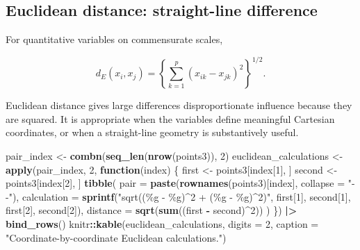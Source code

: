 \documentclass[
  english,
]{article}
\newenvironment{Shaded}{\begin{snugshade}}{\end{snugshade}}
\newcommand{\AttributeTok}[1]{\textcolor[rgb]{0.13,0.29,0.53}{#1}}
\newcommand{\ControlFlowTok}[1]{\textcolor[rgb]{0.13,0.29,0.53}{\textbf{#1}}}
\newcommand{\DecValTok}[1]{\textcolor[rgb]{0.00,0.00,0.81}{#1}}
\newcommand{\FunctionTok}[1]{\textcolor[rgb]{0.13,0.29,0.53}{\textbf{#1}}}
\newcommand{\NormalTok}[1]{#1}
\newcommand{\OtherTok}[1]{\textcolor[rgb]{0.56,0.35,0.01}{#1}}
\newcommand{\SpecialCharTok}[1]{\textcolor[rgb]{0.81,0.36,0.00}{\textbf{#1}}}
\newcommand{\StringTok}[1]{\textcolor[rgb]{0.31,0.60,0.02}{#1}}
\begin{document}
\subsection{Euclidean distance: straight-line
difference}\label{euclidean-distance-straight-line-difference}

For quantitative variables on commensurate scales,

\[d_E(x_i,x_j)=\left\{\sum_{k=1}^p(x_{ik}-x_{jk})^2\right\}^{1/2}.\]

Euclidean distance gives large differences disproportionate influence
because they are squared. It is appropriate when the variables define
meaningful Cartesian coordinates, or when a straight-line geometry is
substantively useful.

\begin{Shaded}
\begin{Highlighting}[]
\NormalTok{pair\_index }\OtherTok{\textless{}{-}} \FunctionTok{combn}\NormalTok{(}\FunctionTok{seq\_len}\NormalTok{(}\FunctionTok{nrow}\NormalTok{(points3)), }\DecValTok{2}\NormalTok{)}
\NormalTok{euclidean\_calculations }\OtherTok{\textless{}{-}} \FunctionTok{apply}\NormalTok{(pair\_index, }\DecValTok{2}\NormalTok{, }\ControlFlowTok{function}\NormalTok{(index) \{}
\NormalTok{  first }\OtherTok{\textless{}{-}}\NormalTok{ points3[index[}\DecValTok{1}\NormalTok{], ]}
\NormalTok{  second }\OtherTok{\textless{}{-}}\NormalTok{ points3[index[}\DecValTok{2}\NormalTok{], ]}
  \FunctionTok{tibble}\NormalTok{(}
    \AttributeTok{pair =} \FunctionTok{paste}\NormalTok{(}\FunctionTok{rownames}\NormalTok{(points3)[index], }\AttributeTok{collapse =} \StringTok{"{-}{-}"}\NormalTok{),}
    \AttributeTok{calculation =} \FunctionTok{sprintf}\NormalTok{(}\StringTok{"sqrt((\%g {-} \%g)\^{}2 + (\%g {-} \%g)\^{}2)"}\NormalTok{,}
\NormalTok{                        first[}\DecValTok{1}\NormalTok{], second[}\DecValTok{1}\NormalTok{], first[}\DecValTok{2}\NormalTok{], second[}\DecValTok{2}\NormalTok{]),}
    \AttributeTok{distance =} \FunctionTok{sqrt}\NormalTok{(}\FunctionTok{sum}\NormalTok{((first }\SpecialCharTok{{-}}\NormalTok{ second)}\SpecialCharTok{\^{}}\DecValTok{2}\NormalTok{))}
\NormalTok{  )}
\NormalTok{\}) }\SpecialCharTok{|\textgreater{}} \FunctionTok{bind\_rows}\NormalTok{()}
\NormalTok{knitr}\SpecialCharTok{::}\FunctionTok{kable}\NormalTok{(euclidean\_calculations, }\AttributeTok{digits =} \DecValTok{2}\NormalTok{,}
             \AttributeTok{caption =} \StringTok{"Coordinate{-}by{-}coordinate Euclidean calculations."}\NormalTok{)}
\end{Highlighting}
\end{Shaded}
\end{document}
